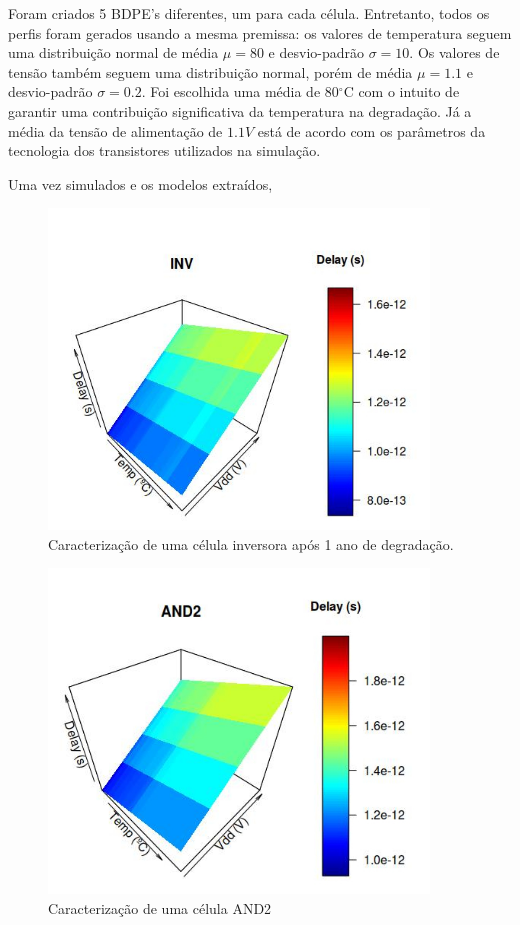 Foram criados 5 BDPE's diferentes, um para cada célula. Entretanto, todos os perfis foram gerados usando a mesma premissa: os valores de temperatura seguem uma distribuição normal de média $\mu = 80$ e desvio-padrão $\sigma=10$. Os valores de tensão também seguem uma distribuição normal, porém de média $\mu = 1.1$ e desvio-padrão $\sigma=0.2$. Foi escolhida uma média de 80$^{\circ}$C com o intuito de garantir uma contribuição significativa da temperatura na degradação. Já a média da tensão de alimentação de $1.1V$ está de acordo com os parâmetros da tecnologia dos transistores utilizados na simulação.
 
Uma vez simulados e os modelos extraídos, 

\begin{figure}[H]
\center
\includegraphics[width=0.9\textwidth]{images/delays_inv_caracterizacao_200Pontos_gauss80_10}
\caption{Caracterização de uma célula inversora após 1 ano de degradação.}
\label{delays_inv_caracterizacao_200Pontos_gauss80_10}	
\end{figure}
\begin{figure}[H]
\center
\includegraphics[width=0.9\textwidth]{images/delays_and2_caracterizacao_200Pontos_gauss80_10}
\caption{Caracterização de uma célula AND2}
\label{delays_and2_caracterizacao_200Pontos_gauss80_10}
\end{figure}
